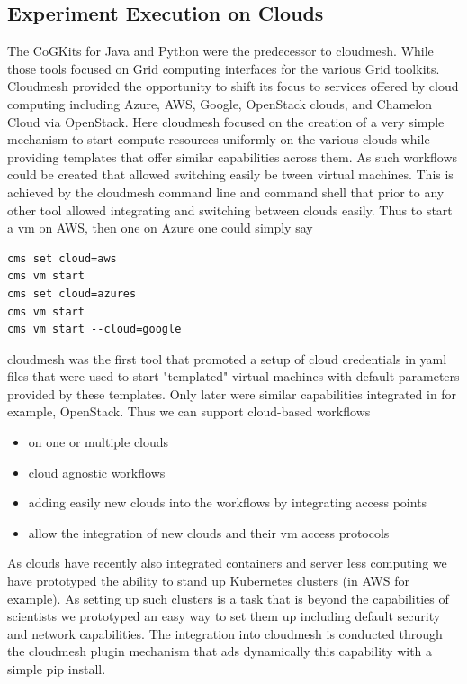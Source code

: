 \documentclass[utf8]{FrontiersinVancouver} %
\begin{document}
\subsection{Experiment Execution on Clouds}

The CoGKits for Java and Python were the predecessor to cloudmesh. While those tools focused on Grid computing interfaces for the various Grid toolkits. Cloudmesh provided the opportunity to shift its focus to services offered by cloud computing including Azure, AWS, Google, OpenStack clouds, and Chamelon Cloud via OpenStack. Here cloudmesh focused on the creation of a very simple mechanism to start compute resources uniformly on the various clouds while providing templates that offer similar capabilities across them. As such workflows could be created that allowed switching easily be tween virtual machines. This is achieved by the cloudmesh command line and command shell that prior to any other tool allowed integrating and switching between clouds easily. Thus to start a vm on AWS, then one on Azure one could simply say

\begin{verbatim}
cms set cloud=aws
cms vm start
cms set cloud=azures
cms vm start
cms vm start --cloud=google
\end{verbatim}

cloudmesh was the first tool that promoted a setup of cloud credentials in yaml files that were used to start "templated" virtual machines with default parameters provided by these templates. Only later were similar capabilities integrated in for example,  OpenStack. Thus we can support cloud-based workflows

\begin{itemize}
    \item on one or multiple clouds
    \item cloud agnostic workflows
    \item adding easily new clouds into the workflows by integrating access points
    \item allow the integration of new clouds and their vm access protocols
\end{itemize}

As clouds have recently also integrated containers and server less computing we have prototyped the ability to stand up Kubernetes clusters (in AWS for example). As setting up such clusters is a task that is beyond the capabilities of scientists we prototyped an easy way to set them up including default security and network capabilities. The integration into cloudmesh is conducted through the cloudmesh plugin mechanism that ads dynamically this capability with a simple pip install.
\end{document}
